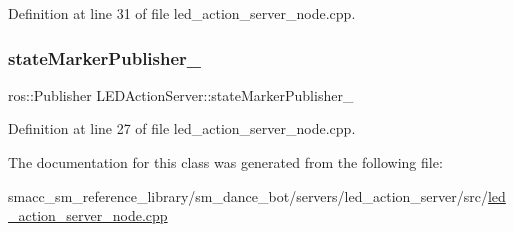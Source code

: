 Definition at line 31 of file led\+\_\+action\+\_\+server\+\_\+node.\+cpp.

\mbox{\label{classLEDActionServer_a4168a1e4a17eb1d65aaa059ce0c52086}} 
\subsubsection{\texorpdfstring{state\+Marker\+Publisher\+\_\+}{stateMarkerPublisher\_}}
{\footnotesize\ttfamily ros\+::\+Publisher L\+E\+D\+Action\+Server\+::state\+Marker\+Publisher\+\_\+}



Definition at line 27 of file led\+\_\+action\+\_\+server\+\_\+node.\+cpp.



The documentation for this class was generated from the following file\+:\begin{DoxyCompactItemize}
\item 
smacc\+\_\+sm\+\_\+reference\+\_\+library/sm\+\_\+dance\+\_\+bot/servers/led\+\_\+action\+\_\+server/src/\hyperlink{sm__dance__bot_2servers_2led__action__server_2src_2led__action__server__node_8cpp}{led\+\_\+action\+\_\+server\+\_\+node.\+cpp}\end{DoxyCompactItemize}

